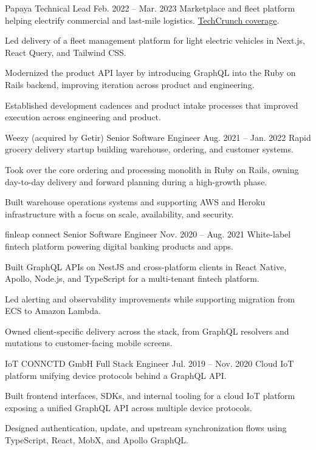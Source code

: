 \ResumeJob
  {Papaya}
  {Technical Lead}
  {Feb. 2022 -- Mar. 2023}
  {Marketplace and fleet platform helping electrify commercial and last-mile logistics. \href{https://techcrunch.com/2022/09/27/papaya-wants-to-help-electrify-last-mile-logistics-in-europe/}{TechCrunch coverage}.}
\begin{ResumeList}
  \item Led delivery of a fleet management platform for light electric vehicles in Next.js, React Query, and Tailwind CSS.
  \item Modernized the product API layer by introducing GraphQL into the Ruby on Rails backend, improving iteration across product and engineering.
  \item Established development cadences and product intake processes that improved execution across engineering and product.
\end{ResumeList}

\ResumeJob
  {Weezy (acquired by Getir)}
  {Senior Software Engineer}
  {Aug. 2021 -- Jan. 2022}
  {Rapid grocery delivery startup building warehouse, ordering, and customer systems.}
\begin{ResumeList}
  \item Took over the core ordering and processing monolith in Ruby on Rails, owning day-to-day delivery and forward planning during a high-growth phase.
  \item Built warehouse operations systems and supporting AWS and Heroku infrastructure with a focus on scale, availability, and security.
\end{ResumeList}

\ResumeJob
  {finleap connect}
  {Senior Software Engineer}
  {Nov. 2020 -- Aug. 2021}
  {White-label fintech platform powering digital banking products and apps.}
\begin{ResumeList}
  \item Built GraphQL APIs on NestJS and cross-platform clients in React Native, Apollo, Node.js, and TypeScript for a multi-tenant fintech platform.
  \item Led alerting and observability improvements while supporting migration from ECS to Amazon Lambda.
  \item Owned client-specific delivery across the stack, from GraphQL resolvers and mutations to customer-facing mobile screens.
\end{ResumeList}

\ResumeJob
  {IoT CONNCTD GmbH}
  {Full Stack Engineer}
  {Jul. 2019 -- Nov. 2020}
  {Cloud IoT platform unifying device protocols behind a GraphQL API.}
\begin{ResumeList}
  \item Built frontend interfaces, SDKs, and internal tooling for a cloud IoT platform exposing a unified GraphQL API across multiple device protocols.
  \item Designed authentication, update, and upstream synchronization flows using TypeScript, React, MobX, and Apollo GraphQL.
\end{ResumeList}

